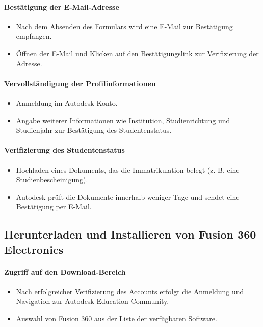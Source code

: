 \paragraph{ Bestätigung der E-Mail-Adresse}
\begin{itemize}
	\item Nach dem Absenden des Formulars wird eine E-Mail zur Bestätigung empfangen.
	\item Öffnen der E-Mail und Klicken auf den Bestätigungslink zur Verifizierung der Adresse.
\end{itemize}

\paragraph{ Vervollständigung der Profilinformationen}
\begin{itemize}
	\item Anmeldung im Autodesk-Konto.
	\item Angabe weiterer Informationen wie Institution, Studienrichtung und Studienjahr zur Bestätigung des Studentenstatus.
\end{itemize}

\paragraph*{ Verifizierung des Studentenstatus}
\begin{itemize}
	\item Hochladen eines Dokuments, das die Immatrikulation belegt (z. B. eine Studienbescheinigung).
	\item Autodesk prüft die Dokumente innerhalb weniger Tage und sendet eine Bestätigung per E-Mail.
\end{itemize}

\subsection*{Herunterladen und Installieren von Fusion 360 Electronics}

\paragraph{Zugriff auf den Download-Bereich}
\begin{itemize}
	\item Nach erfolgreicher Verifizierung des Accounts erfolgt die Anmeldung und Navigation zur \href{https://www.autodesk.com/education/home}{\underline{Autodesk Education Community}}.
	\item Auswahl von Fusion 360 aus der Liste der verfügbaren Software.
\end{itemize}

